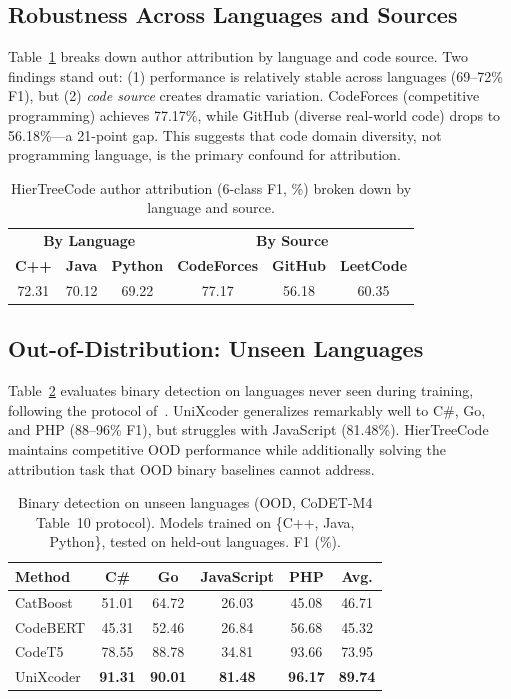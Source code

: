 \documentclass{article}
\begin{document}
\subsection{Robustness Across Languages and Sources}

Table~\ref{tab:breakdown} breaks down author attribution by language and code source. Two findings stand out: (1) performance is relatively stable across languages (69--72\% F1), but (2) \emph{code source} creates dramatic variation. CodeForces (competitive programming) achieves 77.17\%, while GitHub (diverse real-world code) drops to 56.18\%---a 21-point gap. This suggests that code domain diversity, not programming language, is the primary confound for attribution.

\begin{table}[t]
\caption{HierTreeCode author attribution (6-class F1, \%) broken down by language and source.}
\label{tab:breakdown}
\centering
\small
\begin{tabular}{ccc|ccc}
\toprule
\multicolumn{3}{c|}{\textbf{By Language}} & \multicolumn{3}{c}{\textbf{By Source}} \\
\textbf{C++} & \textbf{Java} & \textbf{Python} & \textbf{CodeForces} & \textbf{GitHub} & \textbf{LeetCode} \\
\midrule
72.31 & 70.12 & 69.22 & 77.17 & 56.18 & 60.35 \\
\bottomrule
\end{tabular}
\end{table}


\subsection{Out-of-Distribution: Unseen Languages}

Table~\ref{tab:ood_lang} evaluates binary detection on languages never seen during training, following the protocol of~\citet{orel2025codet}. UniXcoder generalizes remarkably well to C\#, Go, and PHP (88--96\% F1), but struggles with JavaScript (81.48\%). HierTreeCode maintains competitive OOD performance while additionally solving the attribution task that OOD binary baselines cannot address.

\begin{table}[t]
\caption{Binary detection on unseen languages (OOD, CoDET-M4 Table~10 protocol). Models trained on \{C++, Java, Python\}, tested on held-out languages. F1 (\%).}
\label{tab:ood_lang}
\centering
\small
\begin{tabular}{lcccc|c}
\toprule
\textbf{Method} & \textbf{C\#} & \textbf{Go} & \textbf{JavaScript} & \textbf{PHP} & \textbf{Avg.} \\
\midrule
CatBoost & 51.01 & 64.72 & 26.03 & 45.08 & 46.71 \\
CodeBERT & 45.31 & 52.46 & 26.84 & 56.68 & 45.32 \\
CodeT5 & 78.55 & 88.78 & 34.81 & 93.66 & 73.95 \\
UniXcoder & \textbf{91.31} & \textbf{90.01} & \textbf{81.48} & \textbf{96.17} & \textbf{89.74} \\
\bottomrule
\end{tabular}
\end{table}
\end{document}
